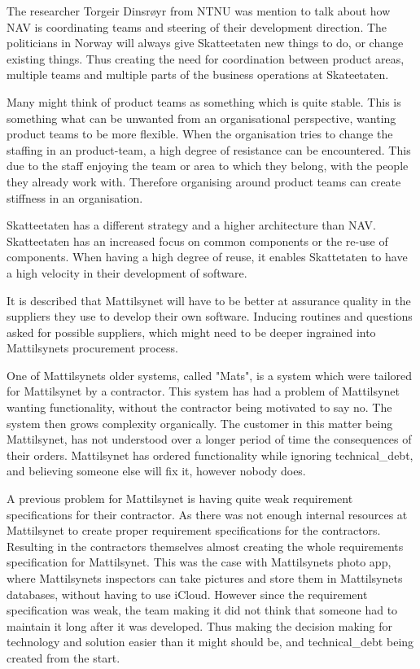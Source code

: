 The researcher Torgeir Dinsrøyr from NTNU was mention to talk about how NAV is coordinating teams and steering of their development direction. The politicians in Norway will always give Skatteetaten new things to do, or change existing things. Thus creating the need for coordination between product areas, multiple teams and multiple parts of the business operations at Skateetaten.

Many might think of product teams as something which is quite stable. This is something what can be unwanted from an organisational perspective, wanting product teams to be more flexible. When the organisation tries to change the staffing in an product-team, a high degree of resistance can be encountered. This due to the staff enjoying the team or area to which they belong, with the people they already work with. Therefore organising around product teams can create stiffness in an organisation.

Skatteetaten has a different strategy and a higher architecture than NAV. Skatteetaten has an increased focus on common components or the re-use of components. When having a high degree of reuse, it enables Skattetaten to have a high velocity in their development of software.

It is described that Mattilsynet will have to be better at assurance quality in the suppliers they use to develop their own software. Inducing routines and questions asked for possible suppliers, which might need to be deeper ingrained into Mattilsynets procurement process.

One of Mattilsynets older systems, called "Mats", is a system which were tailored for Mattilsynet by a contractor. This system has had a problem of Mattilsynet wanting functionality, without the contractor being motivated to say no. The system then grows complexity organically. The customer in this matter being Mattilsynet, has not understood over a longer period of time the consequences of their orders. Mattilsynet has ordered functionality while ignoring \gls{technical_debt}, and believing someone else will fix it, however nobody does.

A previous problem for Mattilsynet is having quite weak requirement specifications for their contractor. As there was not enough internal resources at Mattilsynet to create proper requirement specifications for the contractors. Resulting in the contractors themselves almost creating the whole requirements specification for Mattilsynet. This was the case with Mattilsynets photo app, where Mattilsynets inspectors can take pictures and store them in Mattilsynets databases, without having to use iCloud. However since the requirement specification was weak, the team making it did not think that someone had to maintain it long after it was developed. Thus making the decision making for technology and solution easier than it might should be, and \gls{technical_debt} being created from the start.

